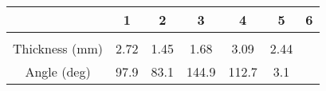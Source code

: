 \documentclass{article}
\begin{document}
    \begin{tabular}{c c c c c c c}
        \toprule
        & 1 & 2 & 3 & 4 & 5 & 6 \\ 
        \midrule\\
        \addlinespace[-2ex]
        Thickness (\si{\milli \meter}) & 2.72 & 1.45 & 1.68 & 3.09 & 2.44 \\
        \addlinespace[1.5ex]
        Angle (deg) & 97.9 & 83.1 & 144.9 & 112.7 & 3.1 \\
        \bottomrule
    \end{tabular}
\end{document}
